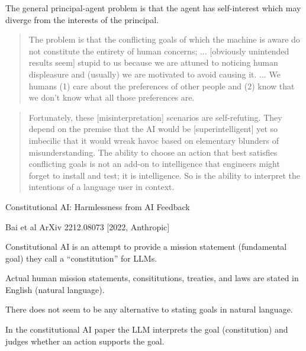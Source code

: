 {\vfill
The general principal-agent problem is that the agent has self-interest which may diverge from the interests of the principal.



\begin{quotation}
  The problem is that the conflicting goals of which the machine is aware do not constitute the entirety of human concerns;
  ...
  [obviously unintended results seem] stupid to us because we are attuned to noticing human displeasure and (usually)
  we are motivated to avoid causing it.
  ...
  We humans (1) care about the preferences of other people and (2) know
  that we don't know what all those preferences are.
\end{quotation}


\begin{quotation}
Fortunately, these [misinterpretation] scenarios are self-refuting. They depend on the premise that
the AI would be [superintelligent] yet so imbecilic
that it would wreak havoc based on elementary blunders of misunderstanding. The ability to
choose an action that best satisfies conflicting goals is not an add-on to intelligence that
engineers might forget to install and test; it is intelligence. So is the ability to interpret the
intentions of a language user in context.
\end{quotation}


\centerline{\huge Constitutional AI: Harmlessness from AI Feedback}
\centerline{\huge Bai et al ArXiv 2212.08073 [2022, Anthropic]}

\vfill
Constitutional AI is an attempt to provide a mission  statement (fundamental goal) they call a ``constitution'' for LLMs.

\vfill
Actual human mission statements, consititutions, treaties, and laws are stated in English (natural language).

\vfill
There does not seem to be any alternative to stating goals in natural language.

\vfill
In the constitutional AI paper the LLM interprets the goal (constitution) and judges whether an action supports the goal.



}
